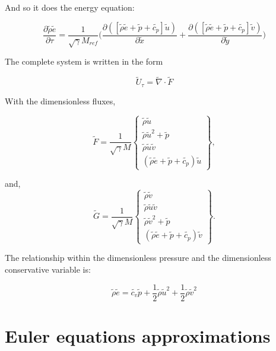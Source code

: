 \documentclass[10pt,a4paper]{article}
\begin{document}
And so it does the energy equation:

\begin{equation}
\frac{\partial \tilde{\rho}\tilde{e}}{\partial \tau} = \frac{1}{\sqrt{\gamma}M_{ref}}\biggl( \frac{\partial ([\tilde{\rho}\tilde{e} + \tilde{p}+\tilde{c_p}]\tilde{u}) }{\partial \tilde{x}}+\frac{\partial ([\tilde{\rho}\tilde{e} + \tilde{p}+\tilde{c_p}]\tilde{v})  }{\partial \tilde{y}}\biggr)
\end{equation}


The complete system is written in the form

\begin{equation}
\tilde{U}_\tau = \tilde{\nabla}\cdot \tilde{F}	
\end{equation}

With the dimensionless fluxes,

\begin{equation}
\tilde{F} =\frac{1}{\sqrt{\gamma}M}\left\{\begin{array}{c} \tilde{\rho}\tilde{u} \\ \tilde{\rho}\tilde{u}^2 + \tilde{p} \\ \tilde{\rho}\tilde{u}\tilde{v} \\ (\tilde{\rho}\tilde{e} + \tilde{p} + \tilde{c_p})\tilde{u}\end{array}\right\},
\end{equation}

and, 
\begin{equation}
\tilde{G} =\frac{1}{\sqrt{\gamma}M}\left\{\begin{array}{c} \tilde{\rho}\tilde{v} \\\tilde{\rho}\tilde{u}\tilde{v} \\ \tilde{\rho}\tilde{v}^2 + \tilde{p}  \\ (\tilde{\rho}\tilde{e} + \tilde{p} + \tilde{c_p})\tilde{v}\end{array}\right\}.
\end{equation}

The relationship within the dimensionless pressure and the dimensionless conservative variable is:

\begin{equation}
\tilde{\rho}\tilde{e} = \tilde{c_v} \tilde{p} + \frac{1}{2}\tilde{\rho}\tilde{u}^2 + \frac{1}{2}\tilde{\rho}\tilde{v}^2	
\end{equation}


\section{Euler equations approximations}
\end{document}
